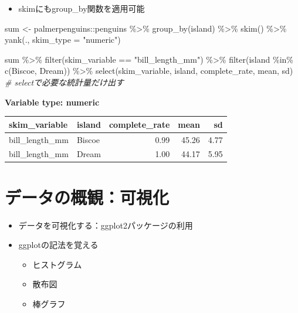 \documentclass[
]{ltjsarticle}
\newenvironment{Shaded}{\begin{snugshade}}{\end{snugshade}}
\newcommand{\AttributeTok}[1]{\textcolor[rgb]{0.77,0.63,0.00}{#1}}
\newcommand{\CommentTok}[1]{\textcolor[rgb]{0.56,0.35,0.01}{\textit{#1}}}
\newcommand{\FunctionTok}[1]{\textcolor[rgb]{0.00,0.00,0.00}{#1}}
\newcommand{\NormalTok}[1]{#1}
\newcommand{\OtherTok}[1]{\textcolor[rgb]{0.56,0.35,0.01}{#1}}
\newcommand{\SpecialCharTok}[1]{\textcolor[rgb]{0.00,0.00,0.00}{#1}}
\newcommand{\StringTok}[1]{\textcolor[rgb]{0.31,0.60,0.02}{#1}}
\providecommand{\tightlist}{%
  \setlength{\itemsep}{0pt}\setlength{\parskip}{0pt}}
\begin{document}
\begin{itemize}
\tightlist
\item
  skimにもgroup\_by関数を適用可能
\end{itemize}

\begin{Shaded}
\begin{Highlighting}[]
\NormalTok{sum }\OtherTok{\textless{}{-}}\NormalTok{ palmerpenguins}\SpecialCharTok{::}\NormalTok{penguins }\SpecialCharTok{\%\textgreater{}\%}
  \FunctionTok{group\_by}\NormalTok{(island) }\SpecialCharTok{\%\textgreater{}\%}
  \FunctionTok{skim}\NormalTok{() }\SpecialCharTok{\%\textgreater{}\%}
  \FunctionTok{yank}\NormalTok{(., }\AttributeTok{skim\_type =} \StringTok{"numeric"}\NormalTok{)}

\NormalTok{sum }\SpecialCharTok{\%\textgreater{}\%}
  \FunctionTok{filter}\NormalTok{(skim\_variable }\SpecialCharTok{==} \StringTok{"bill\_length\_mm"}\NormalTok{) }\SpecialCharTok{\%\textgreater{}\%}
  \FunctionTok{filter}\NormalTok{(island }\SpecialCharTok{\%in\%} \FunctionTok{c}\NormalTok{(}\StringTok{\textquotesingle{}Biscoe\textquotesingle{}}\NormalTok{, }\StringTok{\textquotesingle{}Dream\textquotesingle{}}\NormalTok{)) }\SpecialCharTok{\%\textgreater{}\%}
  \FunctionTok{select}\NormalTok{(skim\_variable, island, complete\_rate, mean, sd) }\CommentTok{\# selectで必要な統計量だけ出す}
\end{Highlighting}
\end{Shaded}

\textbf{Variable type: numeric}

\begin{longtable}[]{@{}llrrr@{}}
\toprule
skim\_variable & island & complete\_rate & mean & sd \\
\midrule
\endhead
bill\_length\_mm & Biscoe & 0.99 & 45.26 & 4.77 \\
bill\_length\_mm & Dream & 1.00 & 44.17 & 5.95 \\
\bottomrule
\end{longtable}

\hypertarget{ux30c7ux30fcux30bfux306eux6982ux89b3ux53efux8996ux5316}{%
\section{データの概観：可視化}\label{ux30c7ux30fcux30bfux306eux6982ux89b3ux53efux8996ux5316}}

\begin{itemize}
\tightlist
\item
  データを可視化する：ggplot2パッケージの利用
\item
  ggplotの記法を覚える

  \begin{itemize}
  \tightlist
  \item
    ヒストグラム
  \item
    散布図
  \item
    棒グラフ
  \end{itemize}
\end{itemize}
\end{document}

